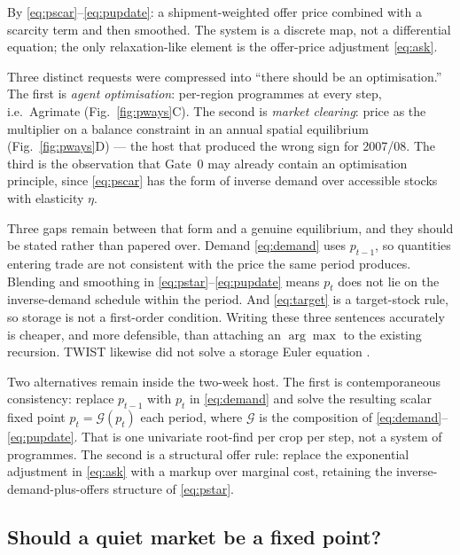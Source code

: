 By \eqref{eq:pscar}--\eqref{eq:pupdate}: a shipment-weighted offer price
combined with a scarcity term and then smoothed. The system is a discrete
map, not a differential equation; the only relaxation-like element is the
offer-price adjustment \eqref{eq:ask}.

Three distinct requests were compressed into ``there should be an
optimisation.'' The first is \emph{agent optimisation}: per-region
programmes at every step, i.e.\ Agrimate (Fig.~\ref{fig:pways}C). The
second is \emph{market clearing}: price as the multiplier on a balance
constraint in an annual spatial equilibrium (Fig.~\ref{fig:pways}D) ---
the host that produced the wrong sign for 2007/08. The third is the
observation that Gate~0 may already contain an optimisation principle,
since \eqref{eq:pscar} has the form of inverse demand over accessible
stocks with elasticity \(\eta\).

Three gaps remain between that form and a genuine equilibrium, and they
should be stated rather than papered over. Demand \eqref{eq:demand} uses
\(p_{t-1}\), so quantities entering trade are not consistent with the
price the same period produces. Blending and smoothing in
\eqref{eq:pstar}--\eqref{eq:pupdate} means \(p_t\) does not lie on the
inverse-demand schedule within the period. And \eqref{eq:target} is a
target-stock rule, so storage is not a first-order condition. Writing
these three sentences accurately is cheaper, and more defensible, than
attaching an \(\arg\max\) to the existing recursion. TWIST likewise did
not solve a storage Euler equation \citep{schewe2017}.

Two alternatives remain inside the two-week host. The first is
contemporaneous consistency: replace \(p_{t-1}\) with \(p_t\) in
\eqref{eq:demand} and solve the resulting scalar fixed point
\(p_t=\mathcal{G}(p_t)\) each period, where \(\mathcal{G}\) is the
composition of \eqref{eq:demand}--\eqref{eq:pupdate}. That is one
univariate root-find per crop per step, not a system of programmes. The
second is a structural offer rule: replace the exponential adjustment in
\eqref{eq:ask} with a markup over marginal cost, retaining the
inverse-demand-plus-offers structure of \eqref{eq:pstar}.


\subsection{Should a quiet market be a fixed point?}

